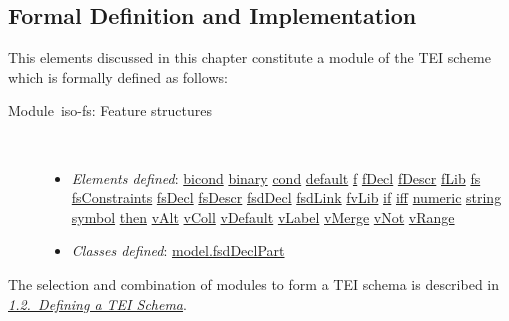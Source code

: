 \subsection[{Formal Definition and Implementation}]{Formal Definition and Implementation}\label{FSDEF}\par
This elements discussed in this chapter constitute a module of the TEI scheme which is formally defined as follows: \begin{description}

\item[{Module iso-fs: Feature structures}]\hspace{1em}\hfill\linebreak
\mbox{}\\[-10pt] \begin{itemize}
\item {\itshape Elements defined}: \hyperref[TEI.bicond]{bicond} \hyperref[TEI.binary]{binary} \hyperref[TEI.cond]{cond} \hyperref[TEI.default]{default} \hyperref[TEI.f]{f} \hyperref[TEI.fDecl]{fDecl} \hyperref[TEI.fDescr]{fDescr} \hyperref[TEI.fLib]{fLib} \hyperref[TEI.fs]{fs} \hyperref[TEI.fsConstraints]{fsConstraints} \hyperref[TEI.fsDecl]{fsDecl} \hyperref[TEI.fsDescr]{fsDescr} \hyperref[TEI.fsdDecl]{fsdDecl} \hyperref[TEI.fsdLink]{fsdLink} \hyperref[TEI.fvLib]{fvLib} \hyperref[TEI.if]{if} \hyperref[TEI.iff]{iff} \hyperref[TEI.numeric]{numeric} \hyperref[TEI.string]{string} \hyperref[TEI.symbol]{symbol} \hyperref[TEI.then]{then} \hyperref[TEI.vAlt]{vAlt} \hyperref[TEI.vColl]{vColl} \hyperref[TEI.vDefault]{vDefault} \hyperref[TEI.vLabel]{vLabel} \hyperref[TEI.vMerge]{vMerge} \hyperref[TEI.vNot]{vNot} \hyperref[TEI.vRange]{vRange}
\item {\itshape Classes defined}: \hyperref[TEI.model.fsdDeclPart]{model.fsdDeclPart}
\end{itemize} 
\end{description}   The selection and combination of modules to form a TEI schema is described in \textit{\hyperref[STIN]{1.2.\ Defining a TEI Schema}}.